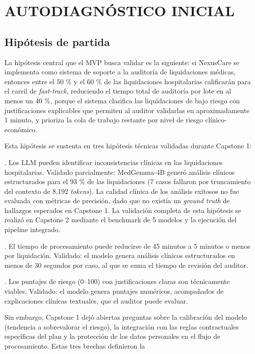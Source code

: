 
\chapter{AUTODIAGNÓSTICO INICIAL}

\section{Hipótesis de partida}

La hipótesis central que el MVP busca validar es la siguiente: si NexusCare se implementa como sistema de soporte a la auditoría de liquidaciones médicas, entonces entre el 50 \% y el 60 \% de las liquidaciones hospitalarias calificarán para el carril de \textit{fast-track}, reduciendo el tiempo total de auditoría por lote en al menos un 40 \%, porque el sistema clasifica las liquidaciones de bajo riesgo con justificaciones explicables que permiten al auditor validarlas en aproximadamente 1 minuto, y prioriza la cola de trabajo restante por nivel de riesgo clínico-económico.

Esta hipótesis se sustenta en tres hipótesis técnicas validadas durante Capstone 1:

. Los LLM pueden identificar inconsistencias clínicas en las liquidaciones hospitalarias. Validado parcialmente: MedGemma-4B generó análisis clínicos estructurados para el 93 \% de las liquidaciones (7 casos fallaron por truncamiento del contexto de 8,192 \textit{tokens}). La calidad clínica de los análisis exitosos no fue evaluada con métricas de precisión, dado que no existía un \textit{ground truth} de hallazgos esperados en Capstone 1. La validación completa de esta hipótesis se realizó en Capstone 2 mediante el benchmark de 5 modelos y la ejecución del pipeline integrado.

. El tiempo de procesamiento puede reducirse de 45 minutos a 5 minutos o menos por liquidación. Validado: el modelo genera análisis clínicos estructurados en menos de 30 segundos por caso, al que se suma el tiempo de revisión del auditor.

. Los puntajes de riesgo (0–100) con justificaciones claras son técnicamente viables. Validado: el modelo genera puntajes numéricos, acompañados de explicaciones clínicas textuales, que el auditor puede evaluar.

Sin embargo, Capstone 1 dejó abiertas preguntas sobre la calibración del modelo (tendencia a sobrevalorar el riesgo), la integración con las reglas contractuales específicas del plan y la protección de los datos personales en el flujo de procesamiento. Estas tres brechas definieron la


